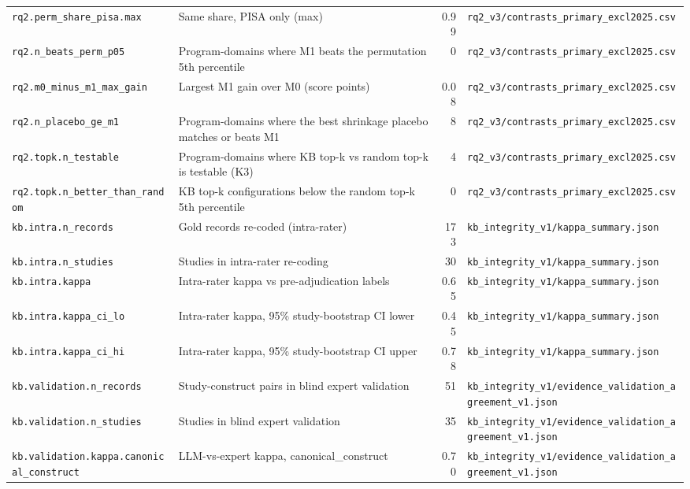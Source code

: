 {\begin{longtable}{p{4.6cm}p{5.6cm}rp{3.6cm}}
\texttt{rq2.perm\_share\_pisa.max} & Same share, PISA only (max) & 0.99 & \texttt{rq2\_v3/contrasts\_primary\_excl2025.csv} \\
\texttt{rq2.n\_beats\_perm\_p05} & Program-domains where M1 beats the permutation 5th percentile & 0 & \texttt{rq2\_v3/contrasts\_primary\_excl2025.csv} \\
\texttt{rq2.m0\_minus\_m1\_max\_gain} & Largest M1 gain over M0 (score points) & 0.08 & \texttt{rq2\_v3/contrasts\_primary\_excl2025.csv} \\
\texttt{rq2.n\_placebo\_ge\_m1} & Program-domains where the best shrinkage placebo matches or beats M1 & 8 & \texttt{rq2\_v3/contrasts\_primary\_excl2025.csv} \\
\texttt{rq2.topk.n\_testable} & Program-domains where KB top-k vs random top-k is testable (K3) & 4 & \texttt{rq2\_v3/contrasts\_primary\_excl2025.csv} \\
\texttt{rq2.topk.n\_better\_than\_random} & KB top-k configurations below the random top-k 5th percentile & 0 & \texttt{rq2\_v3/contrasts\_primary\_excl2025.csv} \\
\texttt{kb.intra.n\_records} & Gold records re-coded (intra-rater) & 173 & \texttt{kb\_integrity\_v1/kappa\_summary.json} \\
\texttt{kb.intra.n\_studies} & Studies in intra-rater re-coding & 30 & \texttt{kb\_integrity\_v1/kappa\_summary.json} \\
\texttt{kb.intra.kappa} & Intra-rater kappa vs pre-adjudication labels & 0.65 & \texttt{kb\_integrity\_v1/kappa\_summary.json} \\
\texttt{kb.intra.kappa\_ci\_lo} & Intra-rater kappa, 95\% study-bootstrap CI lower & 0.45 & \texttt{kb\_integrity\_v1/kappa\_summary.json} \\
\texttt{kb.intra.kappa\_ci\_hi} & Intra-rater kappa, 95\% study-bootstrap CI upper & 0.78 & \texttt{kb\_integrity\_v1/kappa\_summary.json} \\
\texttt{kb.validation.n\_records} & Study-construct pairs in blind expert validation & 51 & \texttt{kb\_integrity\_v1/evidence\_validation\_agreement\_v1.json} \\
\texttt{kb.validation.n\_studies} & Studies in blind expert validation & 35 & \texttt{kb\_integrity\_v1/evidence\_validation\_agreement\_v1.json} \\
\texttt{kb.validation.kappa.canonical\_construct} & LLM-vs-expert kappa, canonical\_construct & 0.70 & \texttt{kb\_integrity\_v1/evidence\_validation\_agreement\_v1.json} \\

\end{longtable}}

